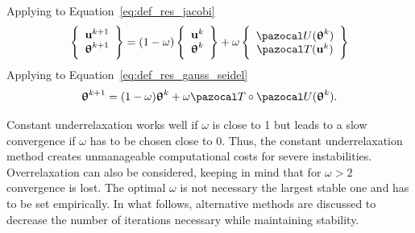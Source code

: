 Applying to Equation~\eqref{eq:def_res_jacobi}
\begin{equation}
  \left\{\begin{array}{c}
    \mathbf u^{k+1}\\
    \bm \uptheta^{k+1}
  \end{array}\right\} =
  (1-\omega)
  \left\{\begin{array}{c}
    \mathbf u^{k}\\
    \bm \uptheta^{k}
  \end{array}\right\}
  + \omega
  \left\{\begin{array}{c}
    \pazocal U(\bm\uptheta^k)\\
    \pazocal T(\mathbf u^k)
  \end{array}\right\}
\end{equation}
Applying to Equation~\eqref{eq:def_res_gauss_seidel}
\begin{equation}
  \bm\uptheta^{k+1} = (1-\omega)\bm\uptheta^k + \omega \pazocal T\circ\pazocal U(\bm \uptheta^k).
\end{equation}


Constant underrelaxation works well if \(\omega\) is close to 1 but leads to a slow convergence if \(\omega\) has to be chosen close to 0.
Thus, the constant underrelaxation method creates unmanageable computational costs for severe instabilities.
Overrelaxation can also be considered, keeping in mind that for \(\omega > 2\) convergence is lost.
The optimal \(\omega\) is not necessary the largest stable one \citep{gatzhammer_efficient_2014} and has to be set empirically.
In what follows, alternative methods are discussed to decrease the number of iterations necessary while maintaining stability.

